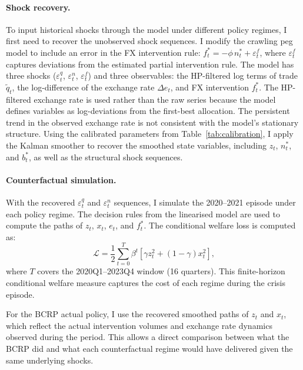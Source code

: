 \documentclass[12pt,a4paper]{article}
\begin{document}
\paragraph{Shock recovery.} To input historical shocks through the model under different policy regimes, I first need to recover the unobserved shock sequences. I modify the crawling peg model to include an error in the FX intervention rule: $f^*_t = -\phi\, n^*_t + \varepsilon^f_t$, where $\varepsilon^f_t$ captures deviations from the estimated partial intervention rule. The model has three shocks ($\varepsilon^q_t$, $\varepsilon^n_t$, $\varepsilon^f_t$) and three observables: the HP-filtered log terms of trade $\tilde{q}_t$, the log-difference of the exchange rate $\Delta e_t$, and FX intervention $f^*_t$. The HP-filtered exchange rate is used rather than the raw series because the model defines variables as log-deviations from the first-best allocation. The persistent trend in the observed exchange rate is not consistent with the model's stationary structure. Using the calibrated parameters from Table~\ref{tab:calibration}, I apply the Kalman smoother to recover the smoothed state variables, including $z_t$, $n^*_t$, and $b^*_t$, as well as the structural shock sequences. 

\paragraph{Counterfactual simulation.} With the recovered $\varepsilon^q_t$ and $\varepsilon^n_t$ sequences, I simulate the 2020--2021 episode under each policy regime. The decision rules from the linearised model are used to compute the paths of $z_t$, $x_t$, $e_t$, and $f^*_t$. The conditional welfare loss is computed as:
\begin{equation}
    \mathcal{L} = \frac{1}{2} \sum_{t=0}^{T} \beta^t \left[\gamma z_t^2 + (1-\gamma) x_t^2\right],
    \label{eq:welfare_cond}
\end{equation}
where $T$ covers the 2020Q1--2023Q4 window (16 quarters). This finite-horizon conditional welfare measure captures the cost of each regime during the crisis episode.

For the BCRP actual policy, I use the recovered smoothed paths of $z_t$ and $x_t$, which reflect the actual intervention volumes and exchange rate dynamics observed during the period. This allows a direct comparison between what the BCRP did and what each counterfactual regime would have delivered given the same underlying shocks.
\end{document}
